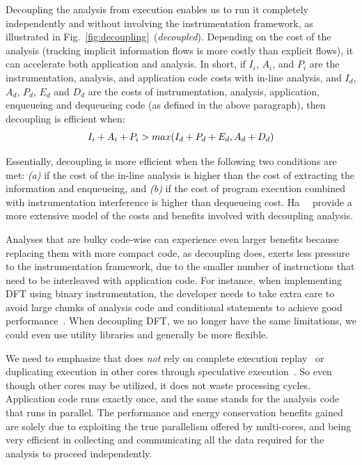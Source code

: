 Decoupling the analysis from execution enables us to run it completely
independently and without involving the instrumentation framework, as
illustrated in Fig.~\ref{fig:decoupling}~(\textit{decoupled}). Depending on the
cost of the analysis (\eg tracking implicit information flows is more costly
than explicit flows), it can accelerate both application and analysis.  In
short, if $I_{i}$, $A_{i}$, and $P_{i}$ are the instrumentation, analysis, and
application code costs with in-line analysis, and $I_{d}$, $A_{d}$, $P_{d}$,
$E_{d}$ and $D_{d}$ are the costs of instrumentation, analysis, application,
enqueueing and dequeueing code (as defined in the above paragraph), then
decoupling is efficient when:
\begin{equation} \vspace{-5pt}
	I_{i} + A_{i} + P_{i} > max(I_{d} + P_{d} + E_{d}, A_{d} + D_{d})
	\label{eqn:efficiency}
\end{equation}
\vspace{-8pt}

Essentially, decoupling is more efficient when the following two conditions are
met: \textit{(a)} if the cost of the in-line analysis is higher than the cost of
extracting the information and enqueueing, and \textit{(b)} if the cost of
program execution combined with instrumentation interference is higher than
dequeueing cost.  Ha~\etal~\cite{cab:oopsala2009} provide a more extensive model
of the costs and benefits involved with decoupling analysis.

Analyses that are bulky code-wise can experience even larger benefits because
replacing them with more compact code, as decoupling does, exerts less
pressure to the instrumentation framework, due to the smaller number of
instructions that need to be interleaved with application code.
For instance, when implementing DFT using binary instrumentation, the
developer needs to take extra care to avoid large chunks of analysis code and
conditional statements to achieve good performance~\cite{libdft}. When
decoupling DFT, we no longer have the same limitations, we could even use
utility libraries and generally be more flexible.

We need to emphasize that \sreplica does \emph{not} rely on complete execution
replay~\cite{aftersight:atc2008, paranoidandroid:acsac10} or duplicating
execution in other cores through speculative execution~\cite{speck:asplos2008,
superpin:cgo2007}. So even though other cores may be utilized, it does not
waste processing cycles.  Application code runs exactly once, and the same
stands for the analysis code that runs in parallel. The performance and energy
conservation benefits gained are solely due to exploiting the true parallelism
offered by multi-cores, and being very efficient in collecting and
communicating all the data required for the analysis to proceed independently.

